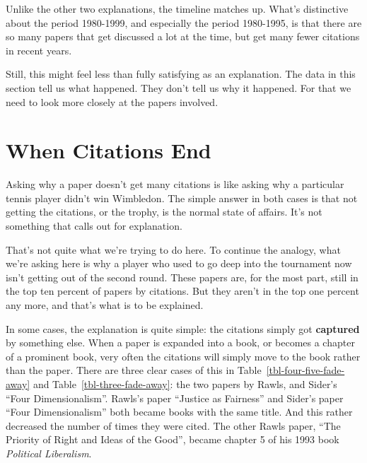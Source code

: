 \documentclass[
  10pt,
  letterpaper,
  DIV=11,
  numbers=noendperiod,
  twoside]{scrartcl}
\begin{document}
Unlike the other two explanations, the timeline matches up. What's
distinctive about the period 1980-1999, and especially the period
1980-1995, is that there are so many papers that get discussed a lot at
the time, but get many fewer citations in recent years.

Still, this might feel less than fully satisfying as an explanation. The
data in this section tell us what happened. They don't tell us why it
happened. For that we need to look more closely at the papers involved.

\section{When Citations End}\label{sec-when-citations-end}

Asking why a paper doesn't get many citations is like asking why a
particular tennis player didn't win Wimbledon. The simple answer in both
cases is that not getting the citations, or the trophy, is the normal
state of affairs. It's not something that calls out for explanation.

That's not quite what we're trying to do here. To continue the analogy,
what we're asking here is why a player who used to go deep into the
tournament now isn't getting out of the second round. These papers are,
for the most part, still in the top ten percent of papers by citations.
But they aren't in the top one percent any more, and that's what is to
be explained.

In some cases, the explanation is quite simple: the citations simply got
\textbf{captured} by something else. When a paper is expanded into a
book, or becomes a chapter of a prominent book, very often the citations
will simply move to the book rather than the paper. There are three
clear cases of this in Table~\ref{tbl-four-five-fade-away} and
Table~\ref{tbl-three-fade-away}: the two papers by Rawls, and Sider's
``Four Dimensionalism''. Rawls's paper ``Justice as Fairness'' and
Sider's paper ``Four Dimensionalism'' both became books with the same
title. And this rather decreased the number of times they were cited.
The other Rawls paper, ``The Priority of Right and Ideas of the Good'',
became chapter 5 of his 1993 book \emph{Political Liberalism}.
\end{document}

